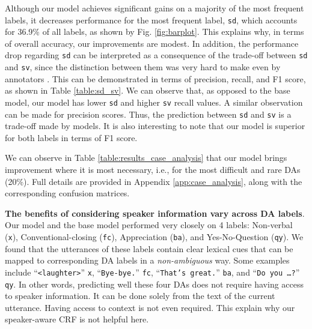 \documentclass[11pt,a4paper]{article}
\begin{document}
Although our model achieves significant gains on a majority of the most frequent labels, it decreases performance for the most frequent label, \texttt{sd}, which accounts for 36.9\% of all labels, as shown by Fig. \ref{fig:barplot}.
This explains why, in terms of overall accuracy, our improvements are modest.
In addition, the performance drop regarding \texttt{sd} can be interpreted as a consequence of the trade-off between \texttt{sd} and \texttt{sv}, since the distinction between them was very hard to make even by annotators \citep{jurafsky1997switchboard}.
This can be demonstrated in terms of precision, recall, and F1 score, as shown in Table \ref{table:sd_sv}.
We can observe that, as opposed to the base model, our model has lower \texttt{sd} and higher \texttt{sv} recall values.
A similar observation can be made for precision scores.
Thus, the prediction between \texttt{sd} and \texttt{sv} is a trade-off made by models.
It is also interesting to note that our model is superior for both labels in terms of F1 score.

\begin{table}[ht]
\small
\centering
\setlength{\tabcolsep}{4pt} \renewcommand{\arraystretch}{1.2} 
\caption{Average accuracy (\%) of our model vs. base model on the 10 DAs best and worst predicted by our model (resp. representing 20\% and 40\% of all annotations).}
\label{table:results_case_analysis}
\end{table}

We can observe in Table \ref{table:results_case_analysis} that our model brings improvement where it is most necessary, i.e., for the most difficult and rare DAs (20\%).
Full details are provided in Appendix \ref{app:case_analysis}, along with the corresponding confusion matrices.

\noindent \textbf{The benefits of considering speaker information vary across DA labels}.
Our model and the base model performed very closely on 4 labels: Non-verbal (\texttt{x}), Conventional-closing (\texttt{fc}), Appreciation (\texttt{ba}), and Yes-No-Question (\texttt{qy}).
We found that the utterances of these labels contain clear lexical cues that can be mapped to corresponding DA labels in a \textit{non-ambiguous} way.
Some examples include ``{\small \texttt{<laughter>}}''  \texttt{x},  ``{\small \texttt{Bye-bye.}}''  \texttt{fc},  ``{\small \texttt{That's great.}}''  \texttt{ba}, and ``{\small \texttt{Do you \dots ?}}''  \texttt{qy}. 
In other words, predicting well these four DAs does not require having access to speaker information.
It can be done solely from the text of the current utterance.
Having access to context is not even required.
This explain why our speaker-aware CRF is not helpful here.
\end{document}
